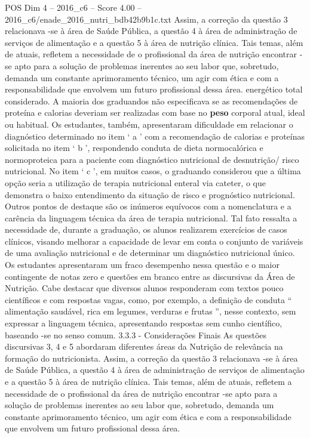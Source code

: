 \begin{textsample}{POS Dim 4 – 2016\_c6 – Score 4.00 – 2016\_c6/enade\_2016\_nutri\_bdb42b9b1c.txt}
Assim, a correção da questão 3 relacionava -se à área de Saúde Pública, a questão 4 à área de administração de serviços de alimentação e a questão 5 à área de nutrição clínica.
Tais temas, além de atuais, refletem a necessidade de o profissional da área de nutrição encontrar -se apto para a solução de problemas inerentes ao seu labor que, sobretudo, demanda um constante aprimoramento técnico, um agir com ética e com a responsabilidade que envolvem um futuro profissional dessa área. energético total considerado.
A maioria dos graduandos não especificava se as recomendações de proteína e calorias deveriam ser realizadas com base no \textbf{peso} corporal atual, ideal ou habitual.
Os estudantes, também, apresentaram dificuldade em relacionar o diagnóstico determinado no item ‘ a ’ com a recomendação de calorias e proteínas solicitada no item ‘ b ’, respondendo conduta de dieta normocalórica e normoproteica para a paciente com diagnóstico nutricional de desnutrição/ risco nutricional.
No item ‘ c ’, em muitos casos, o graduando considerou que a última opção seria a utilização de terapia nutricional enteral via cateter, o que demonstra o baixo entendimento da situação de risco e prognóstico nutricional.
Outros pontos de destaque são os inúmeros equívocos com a nomenclatura e a carência da linguagem técnica da área de terapia nutricional.
Tal fato ressalta a necessidade de, durante a graduação, os alunos realizarem exercícios de casos clínicos, visando melhorar a capacidade de levar em conta o conjunto de variáveis de uma avaliação nutricional e de determinar um diagnóstico nutricional único.
Os estudantes apresentaram um fraco desempenho nessa questão e o maior contingente de notas zero e questões em branco entre as discursivas da Área de Nutrição.
Cabe destacar que diversos alunos responderam com textos pouco científicos e com respostas vagas, como, por exemplo, a definição de conduta “ alimentação saudável, rica em legumes, verduras e frutas ”, nesse contexto, sem expressar a linguagem técnica, apresentando respostas sem cunho científico, baseando -se no senso comum. 3.3.3 - Considerações Finais As questões discursivas 3, 4 e 5 abordaram diferentes áreas da Nutrição de relevância na formação do nutricionista.
Assim, a correção da questão 3 relacionava -se à área de Saúde Pública, a questão 4 à área de administração de serviços de alimentação e a questão 5 à área de nutrição clínica.
Tais temas, além de atuais, refletem a necessidade de o profissional da área de nutrição encontrar -se apto para a solução de problemas inerentes ao seu labor que, sobretudo, demanda um constante aprimoramento técnico, um agir com ética e com a responsabilidade que envolvem um futuro profissional dessa área.

\end{textsample}

